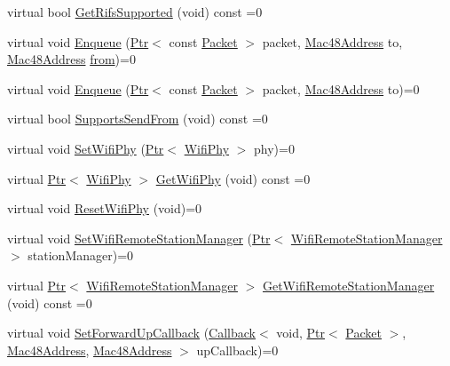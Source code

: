 \begin{DoxyCompactItemize}
\item 
virtual bool \hyperlink{classns3_1_1WifiMac_a7abebd5f62871593e4aa5be017a76388}{Get\+Rifs\+Supported} (void) const =0
\item 
virtual void \hyperlink{classns3_1_1WifiMac_a8681172f4afad9d1e7911ef1a0b99311}{Enqueue} (\hyperlink{classns3_1_1Ptr}{Ptr}$<$ const \hyperlink{classns3_1_1Packet}{Packet} $>$ packet, \hyperlink{classns3_1_1Mac48Address}{Mac48\+Address} to, \hyperlink{classns3_1_1Mac48Address}{Mac48\+Address} \hyperlink{lte__amc_8m_a1b4c81ff74eb1a626b5ade44c81004b3}{from})=0
\item 
virtual void \hyperlink{classns3_1_1WifiMac_a875eb6ff196defef9a92f61ffa70136f}{Enqueue} (\hyperlink{classns3_1_1Ptr}{Ptr}$<$ const \hyperlink{classns3_1_1Packet}{Packet} $>$ packet, \hyperlink{classns3_1_1Mac48Address}{Mac48\+Address} to)=0
\item 
virtual bool \hyperlink{classns3_1_1WifiMac_af046b2bb638a1e12022a2f881613af64}{Supports\+Send\+From} (void) const =0
\item 
virtual void \hyperlink{classns3_1_1WifiMac_a0404fb844d2b92eac5e0b6f35ae31c08}{Set\+Wifi\+Phy} (\hyperlink{classns3_1_1Ptr}{Ptr}$<$ \hyperlink{classns3_1_1WifiPhy}{Wifi\+Phy} $>$ phy)=0
\item 
virtual \hyperlink{classns3_1_1Ptr}{Ptr}$<$ \hyperlink{classns3_1_1WifiPhy}{Wifi\+Phy} $>$ \hyperlink{classns3_1_1WifiMac_a8a96d1077bb5aa656ffec93342534d47}{Get\+Wifi\+Phy} (void) const =0
\item 
virtual void \hyperlink{classns3_1_1WifiMac_ae9a9b9fa0c0bdff641b9771249b0347e}{Reset\+Wifi\+Phy} (void)=0
\item 
virtual void \hyperlink{classns3_1_1WifiMac_ac6d1b335852aaf941389722df50fcd78}{Set\+Wifi\+Remote\+Station\+Manager} (\hyperlink{classns3_1_1Ptr}{Ptr}$<$ \hyperlink{classns3_1_1WifiRemoteStationManager}{Wifi\+Remote\+Station\+Manager} $>$ station\+Manager)=0
\item 
virtual \hyperlink{classns3_1_1Ptr}{Ptr}$<$ \hyperlink{classns3_1_1WifiRemoteStationManager}{Wifi\+Remote\+Station\+Manager} $>$ \hyperlink{classns3_1_1WifiMac_a2ce120afc97cde6a2be849e87afc4d6a}{Get\+Wifi\+Remote\+Station\+Manager} (void) const =0
\item 
virtual void \hyperlink{classns3_1_1WifiMac_a7f5918e39cfbe48fa956ac96ae2dd1a0}{Set\+Forward\+Up\+Callback} (\hyperlink{classns3_1_1Callback}{Callback}$<$ void, \hyperlink{classns3_1_1Ptr}{Ptr}$<$ \hyperlink{classns3_1_1Packet}{Packet} $>$, \hyperlink{classns3_1_1Mac48Address}{Mac48\+Address}, \hyperlink{classns3_1_1Mac48Address}{Mac48\+Address} $>$ up\+Callback)=0

\end{DoxyCompactItemize}

